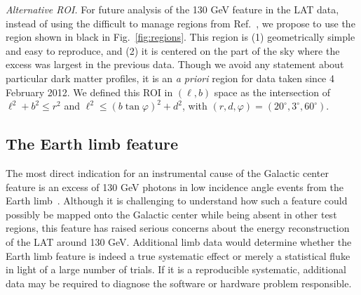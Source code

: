 \documentclass[aps,prd,superscriptaddress,nofootinbib,fixlfloat, 12pt]{revtex4-1}
\begin{document}
\emph{Alternative ROI.} For future analysis of the 130 GeV feature in the LAT
data, instead of using the difficult to manage regions from
Ref.~\cite{Weniger:2012}, we propose to use the region shown in black in
Fig.~\ref{fig:regions}. This region is (1) geometrically simple and easy to reproduce, and (2)
it is centered on the part of the sky where the excess was largest in the
previous data. Though we avoid any statement about particular dark matter
profiles, it is an \emph{a priori} region for data taken since 4 February
2012. We defined this ROI in $(\ell, b)$ space as the intersection of
$\ell^2+b^2\leq
r^2$ and $\ell^2\leq (b\tan\varphi)^2 + d^2$, with $(r, d, \varphi) =
(20^\circ, 3^\circ, 60^\circ)$. 

\subsection{The Earth limb feature}
The most direct indication for an instrumental cause of the Galactic center
feature is an excess of 130 GeV photons in low incidence angle events from
the Earth limb~\cite{linepaper, finkbeiner_systematics, Hektor:2012ev,
bloom_charles_fermi_lat_line}. Although it is challenging to understand how
such a feature could possibly be mapped onto the Galactic center while being
absent in other test regions, this feature has raised serious concerns about the
energy reconstruction of the LAT around 130 GeV.  Additional limb data would
determine whether the Earth limb feature is indeed a true systematic effect or
merely a statistical fluke in light of a large number of trials.  If it is a
reproducible systematic, additional data may be required to diagnose the
software or hardware problem responsible. 
\end{document}

